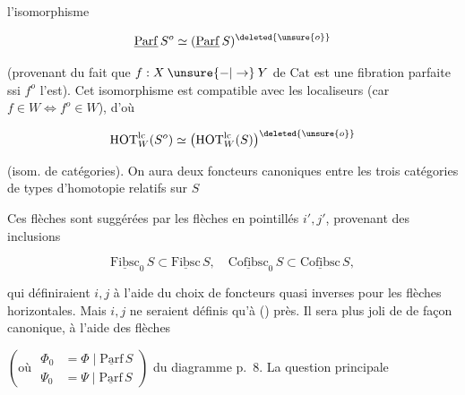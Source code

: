  l'isomorphisme

\[
 \underline{\mathrm{Parf}}\,S^o\simeq(\underline{\mathrm{Parf}}\,S)^{\deleted{\unsure{o}}}
\]

(provenant du fait que $f:X\mathbin{\unsure{-|\to}}Y$ de $\mathrm{Cat}$ est une fibration parfaite ssi $f^o$ l'est). Cet isomorphisme  est compatible avec les localiseurs (car $f\in W\Longleftrightarrow f^o\in W$), d'où

\[
 \mathrm{HOT}^{\mathrm{lc}}_W(S^o)\simeq\bigl(\mathrm{HOT}^{\mathrm{lc}}_W(S)\bigr)^{\deleted{\unsure{o}}}
\]

(isom. de catégories). On aura deux foncteurs canoniques entre les trois catégories de types d'homotopie relatifs sur $S$


Ces flèches  sont suggérées par les flèches en pointillés $i',j'$, provenant des inclusions

\[
 \underline{\mathrm{Fibsc}}_0\,S\subset\underline{\mathrm{Fibsc}}\,S,\quad
 \underline{\mathrm{Cofibsc}}_0\,S\subset\underline{\mathrm{Cofibsc}}\,S,
\]

qui définiraient $i,j$ à l'aide du choix de foncteurs quasi inverses pour les flèches horizontales. Mais $i,j$ ne seraient définis qu'à  () près. Il sera plus joli de   de façon canonique, à l'aide des flèches


$\left(\text{où }\begin{aligned}\Phi_0&=\Phi\mid\underline{\mathrm{Parf}}\,S\\ \Psi_0&=\Psi\mid\underline{\mathrm{Parf}}\,S\end{aligned}\right)$ du diagramme p.~8. La question principale

